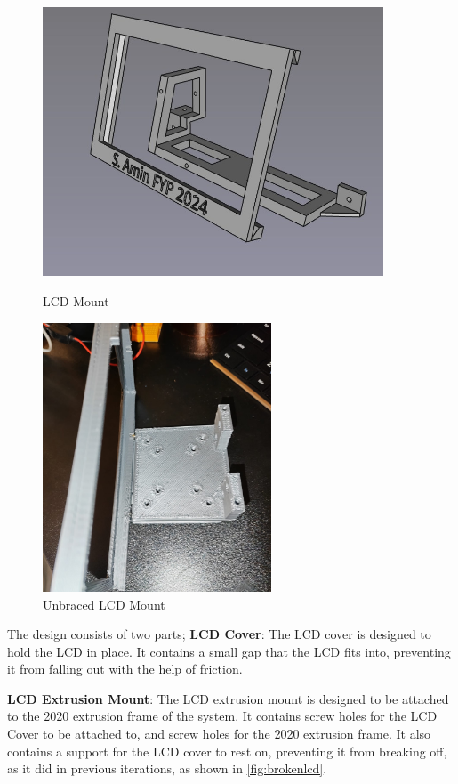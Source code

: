 \begin{figure}[ht]
    \begin{minipage}{0.6\textwidth}
        \centering
        \includegraphics[height=8cm]{imgs/freecad/lcd_mount2.jpg}
        \caption{LCD Mount}
    \end{minipage}
    \hfill
    \begin{minipage}{0.4\textwidth}
        \centering
        \includegraphics[height=8cm]{imgs/design/unbracedscreen.jpeg}
        \caption{Unbraced LCD Mount}
        \label{fig:brokenlcd}
    \end{minipage}
\end{figure}

The design consists of two parts;
\textbf{LCD Cover}: The LCD cover is designed to hold the LCD in place. It contains a small gap that the LCD fits into, preventing it from falling out with the help of friction.
\par
\textbf{LCD Extrusion Mount}: The LCD extrusion mount is designed to be attached to the 2020 extrusion frame of the system. It contains screw holes for the LCD Cover to be attached to, and screw holes for the 2020 extrusion frame. It also contains a support for the LCD cover to rest on, preventing it from breaking off, as it did in previous iterations, as shown in \autoref{fig:brokenlcd}.


